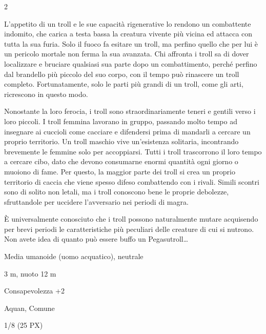 \begin{multicols}{2}
{L'appetito di un troll e le sue capacità rigenerative lo rendono un combattente indomito, che carica a testa bassa la creatura vivente più vicina ed attacca con tutta la sua furia. Solo il fuoco fa esitare un troll, ma perfino quello che per lui è un pericolo mortale non ferma la sua avanzata. Chi affronta i troll sa di dover localizzare e bruciare qualsiasi sua parte dopo un combattimento, perché perfino dal brandello più piccolo del suo corpo, con il tempo può rinascere un troll completo. Fortunatamente, solo le parti più grandi di un troll, come gli arti, ricrescono in questo modo.

Nonostante la loro ferocia, i troll sono straordinariamente teneri e gentili verso i loro piccoli. I troll femmina lavorano in gruppo, passando molto tempo ad insegnare ai cuccioli come cacciare e difendersi prima di mandarli a cercare un proprio territorio. Un troll maschio vive un'esistenza solitaria, incontrando brevemente le femmine solo per accoppiarsi. Tutti i troll trascorrono il loro tempo a cercare cibo, dato che devono consumarne enormi quantità ogni giorno o muoiono di fame. Per questo, la maggior parte dei troll si crea un proprio territorio di caccia che viene spesso difeso combattendo con i rivali. Simili scontri sono di solito non letali, ma i troll conoscono bene le proprie debolezze, sfruttandole per uccidere l'avversario nei periodi di magra.

È universalmente conosciuto che i troll possono naturalmente mutare acquisendo per brevi periodi le caratteristiche più peculiari delle creature di cui si nutrono. Non avete idea di quanto può essere buffo un Pegasutroll…


\begin{description}[noitemsep, topsep=0pt, parsep=0pt, partopsep=0pt, itemsep=1pt, leftmargin=2.35cm,  labelwidth=2.2cm, itemindent=0cm, listparindent=0pt] %
\setlength{\baselineskip}{10pt}
\item[\textbf{Taglia/Tipo}] Media umanoide (uomo acquatico), neutrale
\item[\textbf{Caratt.}] 
\item[\textbf{Punti Ferita}] 
\item[\textbf{Movimento}] 3 m, nuoto 12 m
\item[\textbf{Tiri Salvez.}] 
\item[\textbf{Comp.}] Consapevolezza +2
\item[\textbf{Linguaggi}] Aquan, Comune
\item[\textbf{Sfida}] 1/8 (25 PX)
\end{description}
\smallskip

}
\end{multicols}
